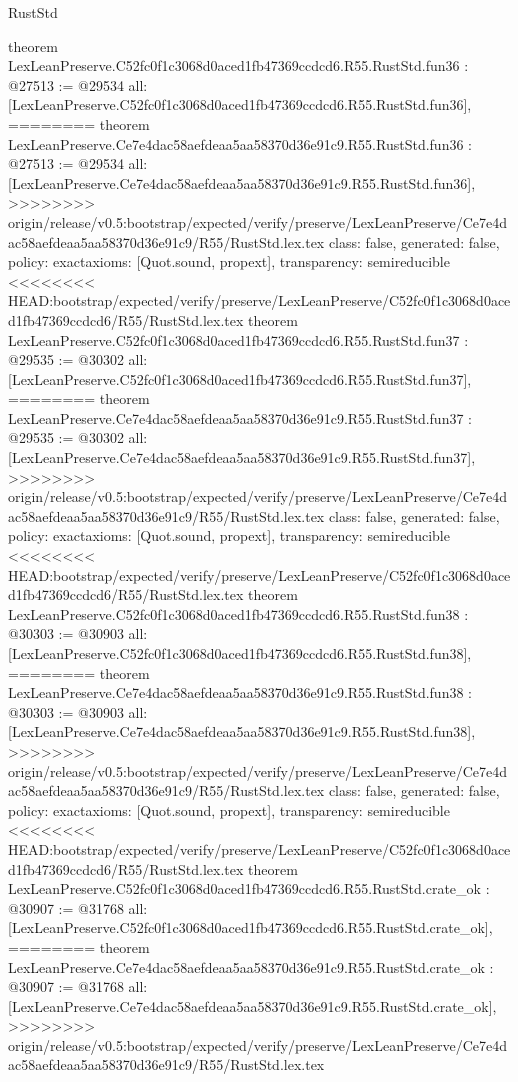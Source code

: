 \begin{lexlean}{RustStd}
\begin{coremodule}
{\begin{coremodule}
{{{{{{{{{{{{{{{{{{{{{{{{{{{{{{{{{{{{{{theorem LexLeanPreserve.C52fc0f1c3068d0aced1fb47369ccdcd6.R55.RustStd.fun36 : @27513 := @29534 {
  all: [LexLeanPreserve.C52fc0f1c3068d0aced1fb47369ccdcd6.R55.RustStd.fun36],
========
theorem LexLeanPreserve.Ce7e4dac58aefdeaa5aa58370d36e91c9.R55.RustStd.fun36 : @27513 := @29534 {
  all: [LexLeanPreserve.Ce7e4dac58aefdeaa5aa58370d36e91c9.R55.RustStd.fun36],
>>>>>>>> origin/release/v0.5:bootstrap/expected/verify/preserve/LexLeanPreserve/Ce7e4dac58aefdeaa5aa58370d36e91c9/R55/RustStd.lex.tex
  class: false,
  generated: false,
  policy: exact{axioms: [Quot.sound, propext]},
  transparency: semireducible
}
<<<<<<<< HEAD:bootstrap/expected/verify/preserve/LexLeanPreserve/C52fc0f1c3068d0aced1fb47369ccdcd6/R55/RustStd.lex.tex
theorem LexLeanPreserve.C52fc0f1c3068d0aced1fb47369ccdcd6.R55.RustStd.fun37 : @29535 := @30302 {
  all: [LexLeanPreserve.C52fc0f1c3068d0aced1fb47369ccdcd6.R55.RustStd.fun37],
========
theorem LexLeanPreserve.Ce7e4dac58aefdeaa5aa58370d36e91c9.R55.RustStd.fun37 : @29535 := @30302 {
  all: [LexLeanPreserve.Ce7e4dac58aefdeaa5aa58370d36e91c9.R55.RustStd.fun37],
>>>>>>>> origin/release/v0.5:bootstrap/expected/verify/preserve/LexLeanPreserve/Ce7e4dac58aefdeaa5aa58370d36e91c9/R55/RustStd.lex.tex
  class: false,
  generated: false,
  policy: exact{axioms: [Quot.sound, propext]},
  transparency: semireducible
}
<<<<<<<< HEAD:bootstrap/expected/verify/preserve/LexLeanPreserve/C52fc0f1c3068d0aced1fb47369ccdcd6/R55/RustStd.lex.tex
theorem LexLeanPreserve.C52fc0f1c3068d0aced1fb47369ccdcd6.R55.RustStd.fun38 : @30303 := @30903 {
  all: [LexLeanPreserve.C52fc0f1c3068d0aced1fb47369ccdcd6.R55.RustStd.fun38],
========
theorem LexLeanPreserve.Ce7e4dac58aefdeaa5aa58370d36e91c9.R55.RustStd.fun38 : @30303 := @30903 {
  all: [LexLeanPreserve.Ce7e4dac58aefdeaa5aa58370d36e91c9.R55.RustStd.fun38],
>>>>>>>> origin/release/v0.5:bootstrap/expected/verify/preserve/LexLeanPreserve/Ce7e4dac58aefdeaa5aa58370d36e91c9/R55/RustStd.lex.tex
  class: false,
  generated: false,
  policy: exact{axioms: [Quot.sound, propext]},
  transparency: semireducible
}
<<<<<<<< HEAD:bootstrap/expected/verify/preserve/LexLeanPreserve/C52fc0f1c3068d0aced1fb47369ccdcd6/R55/RustStd.lex.tex
theorem LexLeanPreserve.C52fc0f1c3068d0aced1fb47369ccdcd6.R55.RustStd.crate_ok : @30907 := @31768 {
  all: [LexLeanPreserve.C52fc0f1c3068d0aced1fb47369ccdcd6.R55.RustStd.crate_ok],
========
theorem LexLeanPreserve.Ce7e4dac58aefdeaa5aa58370d36e91c9.R55.RustStd.crate_ok : @30907 := @31768 {
  all: [LexLeanPreserve.Ce7e4dac58aefdeaa5aa58370d36e91c9.R55.RustStd.crate_ok],
>>>>>>>> origin/release/v0.5:bootstrap/expected/verify/preserve/LexLeanPreserve/Ce7e4dac58aefdeaa5aa58370d36e91c9/R55/RustStd.lex.tex
}}}}}}}}}}}}}}}}}}}}}}}}}}}}}}}}}}}}}}}}}}}
\end{coremodule}}
\end{coremodule}
\end{lexlean}
